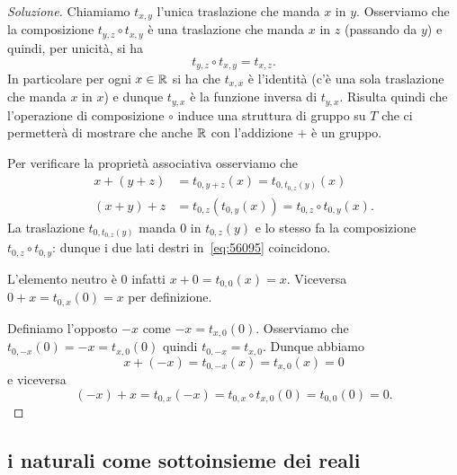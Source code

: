 \begin{proof}[Soluzione]
Chiamiamo $t_{x,y}$ l'unica traslazione che manda $x$ in $y$.
Osserviamo che la composizione $t_{y,z}\circ t_{x,y}$ è una traslazione 
che manda $x$ in $z$ (passando da $y$) e quindi, per unicità, si ha 
\[
  t_{y,z}\circ t_{x,y} = t_{x,z}.
\]
In particolare per ogni $x\in {\mathbb R}$ si ha che $t_{x,x}$ è l'identità
(c'è una sola traslazione che manda $x$ in $x$) e dunque $t_{y,x}$ 
è la funzione inversa di $t_{y,x}$. Risulta quindi che 
l'operazione di composizione $\circ$ induce una struttura di gruppo 
su $T$ che ci permetterà di mostrare che anche ${\mathbb R}$ con l'addizione
$+$ è un gruppo.

Per verificare la proprietà associativa 
osserviamo che
\begin{equation}\label{eq:56095}
  \begin{aligned}
x + (y + z) &= t_{0,y+z}(x)=t_{0,t_{0,z}(y)}(x)  \\
(x + y) + z &= t_{0,z}(t_{0,y}(x)) = t_{0,z}\circ t_{0,y}(x).
  \end{aligned}
\end{equation}
La traslazione $t_{0,t_{0,z}(y)}$ manda $0$ in $t_{0,z}(y)$
e lo stesso fa la composizione $t_{0,z}\circ t_{0,y}$:
dunque i due lati destri in~\eqref{eq:56095} coincidono.

L'elemento neutro è $0$ infatti $x + 0 = t_{0,0}(x) = x$.
Viceversa $0 + x = t_{0,x}(0) = x$ per definizione.

Definiamo l'opposto $-x$ come $-x=t_{x,0}(0)$.
Osserviamo che $t_{0,-x}(0) = -x = t_{x,0}(0)$ quindi 
$t_{0,-x} = t_{x,0}$. Dunque abbiamo 
\[
 x + (-x) = t_{0,-x}(x) = t_{x,0}(x) = 0  
\]
e viceversa 
\[
  (-x) + x = t_{0,x}(-x) = t_{0,x}\circ t_{x,0}(0) 
   = t_{0,0}(0) = 0.  
\]
\end{proof}


\subsection{i naturali come sottoinsieme dei reali}


